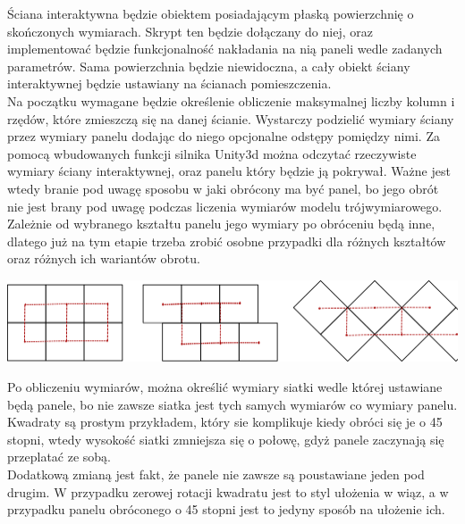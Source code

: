 \documentclass{article} %
\begin{document}
            Ściana interaktywna będzie obiektem posiadającym płaską powierzchnię o skończonych wymiarach. Skrypt ten będzie dołączany do niej, oraz implementować będzie funkcjonalność nakładania na nią paneli wedle zadanych parametrów. Sama powierzchnia będzie niewidoczna, a cały obiekt ściany interaktywnej będzie ustawiany na ścianach pomieszczenia.
            \\
            
            Na początku wymagane będzie określenie obliczenie maksymalnej liczby kolumn i rzędów, które zmieszczą się na danej ścianie. Wystarczy podzielić wymiary ściany przez wymiary panelu dodając do niego opcjonalne odstępy pomiędzy nimi. Za pomocą wbudowanych funkcji silnika Unity3d można odczytać rzeczywiste wymiary ściany interaktywnej, oraz panelu który będzie ją pokrywał. Ważne jest wtedy branie pod uwagę sposobu w jaki obrócony ma być panel, bo jego obrót nie jest brany pod uwagę podczas liczenia wymiarów modelu trójwymiarowego. Zależnie od wybranego kształtu panelu jego wymiary po obróceniu będą inne, dlatego już na tym etapie trzeba zrobić osobne przypadki dla różnych kształtów oraz różnych ich wariantów obrotu.
            \\
            
            \begin{center}
                \includegraphics[scale=0.2,keepaspectratio=true]{images/diagrams/panel_tiling_square.png}
            \end{center}

            
            Po obliczeniu wymiarów, można określić wymiary siatki wedle której ustawiane będą panele, bo nie zawsze siatka jest tych samych wymiarów co wymiary panelu. Kwadraty są prostym przykładem, który sie komplikuje kiedy obróci się je o 45 stopni, wtedy wysokość siatki zmniejsza się o połowę, gdyż panele zaczynają się przeplatać ze sobą.
            \\
            
            Dodatkową zmianą jest fakt, że panele nie zawsze są poustawiane jeden pod drugim. W przypadku zerowej rotacji kwadratu jest to styl ułożenia w wiąz, a w przypadku panelu obróconego o 45 stopni jest to jedyny sposób na ułożenie ich.
            \\
            
\end{document}
